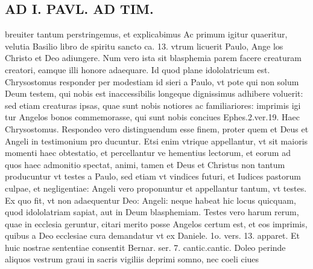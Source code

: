 \documentclass{article}
\begin{document}
\begin{pages}
\section*{AD I. PAVL. AD TIM. }
\marginpar{[ p.33 ]}\pstart breuiter tantum perstringemus, et explicabimus Ac primum igitur quaeritur, velutia Basilio libro de spiritu sancto ca. 13. vtrum licuerit Paulo, Ange los Christo et Deo adiungere. Num vero ista sit blasphemia parem facere creaturam creatori, eamque illi honore adaequare. Id quod plane idololatricum est. Chrysostomus responder per modestiam id sieri a Paulo, vt pote qui non solum Deum testem, qui nobis est inaccessibilis longeque dignissimus adhibere voluerit: sed etiam creaturas ipsas, quae sunt nobis notiores ac familiariores: imprimis igi tur Angelos bonos commemorasse, qui sunt nobis conciues Ephes.2.ver.19. Haec Chrysostomus. Respondeo vero distinguendum esse finem, proter quem et Deus et Angeli in testimonium pro ducuntur. Etsi enim vtrique appellantur, vt sit maioris momenti haec obtestatio, et percellantur ve hementius lectorum, et eorum ad quos haec admonitio spectat, animi, tamen et Deus et Christus non tantum producuntur vt testes a Paulo, sed etiam vt vindices futuri, et Iudices pastorum culpae, et negligentiae: Angeli vero proponuntur et appellantur tantum, vt testes. Ex quo fit, vt non adaequentur Deo: Angeli: neque habeat hic locus quicquam, quod idololatriam sapiat, aut in Deum blasphemiam. Testes vero harum rerum, quae in ecclesia geruntur, citari merito posse Angelos certum est, et eos imprimis, quibus a Deo ecclesiae cura demandatur vt ex Daniele. 1o. vers. 13. apparet. Et huic nostrae sententiae consentit Bernar. ser. 7. cantic.cantic. Doleo perinde aliquos vestrum graui in sacris vigiliis deprimi somno, nec coeli ciues  \pend

\end{pages}
\end{document}
